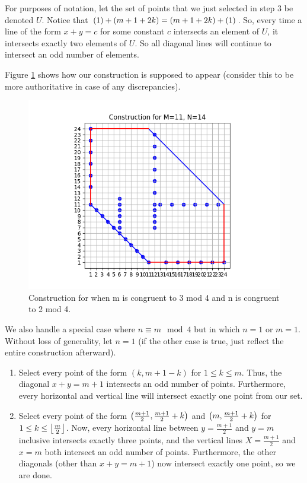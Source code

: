 \documentclass[10pt]{../usamts}
\begin{document}
\begin{solution}
\begin{enumerate}
    For purposes of notation, let the set of points that we just selected in step 3 be denoted $U$. Notice that $\left( 1 \right)+\left( m+1+2k \right) = \left( m+1+2k \right)+\left( 1 \right)$. So, every time a line of the form $x+y=c$ for some constant $c$ intersects an element of $U$, it intersects exactly two elements of $U$. So all diagonal lines will continue to intersect an odd number of elements.
\end{enumerate}

Figure \ref{fig:twothreeconstruct} shows how our construction is supposed to appear (consider this to be more authoritative in case of any discrepancies).
\begin{figure}[htbp]
\centering
    \includegraphics[width=12cm]{round2/p5construct/construct_11_14.png}
    \caption{Construction for when m is congruent to 3 mod 4 and n is congruent to 2 mod 4.}
    \label{fig:twothreeconstruct}
\end{figure}

\clearpage

We also handle a special case where $n \equiv m \mod 4$ but in which $n=1$ or $m=1$. Without loss of generality, let $n=1$ (if the other case is true, just reflect the entire construction afterward).

\begin{enumerate}
    \item Select every point of the form $(k,m+1-k)$ for $1 \le k \le m$. Thus, the diagonal $x+y=m+1$ intersects an odd number of points. Furthermore, every horizontal and vertical line will intersect exactly one point from our set.
    \item Select every point of the form $\left( \frac{m+1}{2}, \frac{m+1}{2}+k \right)$ and $\left( m, \frac{m+1}{2}+k \right)$ for $1 \le k \le \left\lfloor \frac{m}{2} \right\rfloor$. Now, every horizontal line between $y=\frac{m+1}{2}$ and $y=m$ inclusive intersects exactly three points, and the vertical lines $X=\frac{m+1}{2}$ and $x=m$ both intersect an odd number of points. Furthermore, the other diagonals (other than $x+y=m+1$) now intersect exactly one point, so we are done.
\end{enumerate}


\end{solution}
\end{document}
